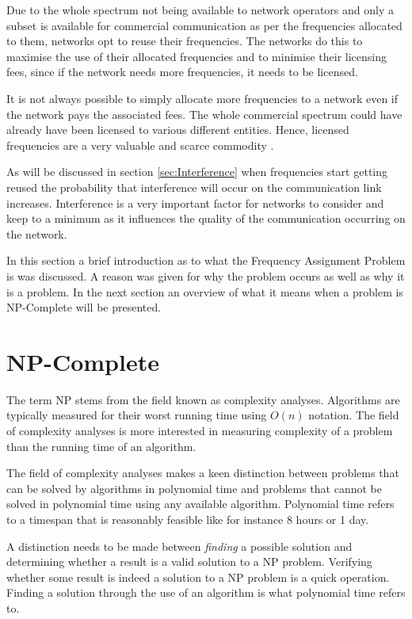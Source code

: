 Due to the whole spectrum not being available to network operators and only a subset is available for commercial communication as per the frequencies allocated to them, networks opt to reuse their frequencies\cite{FAPInCell}. The networks do this to maximise the use of their allocated frequencies and to minimise their licensing fees, since if the network needs more frequencies, it needs to be licensed\cite{FAPRAMColouring}.

It is not always possible to simply allocate more frequencies to a network even if the network pays the associated fees. The whole commercial spectrum could have already have been licensed to various different entities. Hence, licensed frequencies are a very valuable and scarce commodity \cite{FAPRAMColouring,FAPInCell,Eisenblatter,Karen2004}.

As will be discussed in section \ref{sec:Interference} when frequencies start getting reused the probability that interference will occur on the communication link increases. Interference is a very important factor for networks to consider and keep to a minimum as it influences the quality of the communication occurring on the network.


In this section a brief introduction as to what the Frequency Assignment Problem is was discussed. A reason was given for why the problem occurs as well as why it is a problem. In the next section an overview of what it means when a problem is NP-Complete will be presented.

\section{NP-Complete}
\label{sec:NPComplete}
The term NP stems from the field known as complexity analyses. Algorithms are typically measured for their worst running time using $O(n)$ notation. The field of complexity analyses is more interested in measuring complexity of a problem than the running time of an algorithm\cite{AIModernApproach}.

The field of complexity analyses makes a keen distinction between problems that can be solved by algorithms in polynomial time and problems that cannot be solved in polynomial time using any available algorithm\cite{AIModernApproach}. Polynomial time refers to a timespan that is reasonably feasible like for instance 8 hours or 1 day.

A distinction needs to be made between \emph{finding} a possible solution and determining whether a result is a valid solution to a NP problem. Verifying whether some result is indeed a solution to a NP problem is a quick operation. Finding a solution through the use of an algorithm is what polynomial time refers to.

